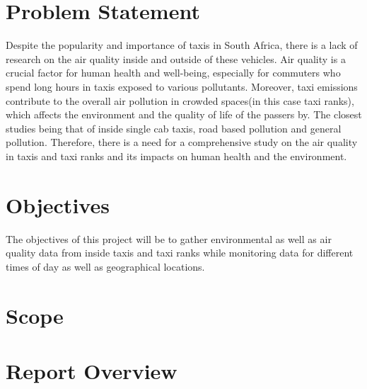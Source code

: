 \section{Problem Statement}
Despite the popularity and importance of taxis in South Africa, there is a lack of research on the air quality inside and outside of these vehicles. 
Air quality is a crucial factor for human health and well-being, especially for commuters who spend long hours in taxis exposed to various pollutants.
Moreover, taxi emissions contribute to the overall air pollution in crowded spaces(in this case taxi ranks), which affects the environment and the quality of life of the passers by. The closest studies being that of inside single cab taxis\cite{insidetaxismall}, road based pollution\cite{taxiNetwork} and general pollution\cite{Environmentalimpact}.
Therefore, there is a need for a comprehensive study on the air quality in taxis and taxi ranks and its impacts on human health and the environment.

\section{Objectives}
The objectives of this project will be to gather environmental as well as air quality data from inside taxis and taxi ranks while monitoring data for different times of day as well as geographical locations.


\section{Scope}


\section{Report Overview}




